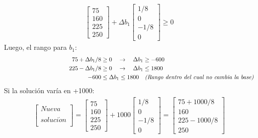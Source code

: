 \begin{enumerate}
\begin{align*}
				\left[{
					\begin{array}{c}
						75\\
						160\\
						225\\
						250	
					\end{array} 
				} \right] 
				+
				\Delta{b_1}
				\left[{
					\begin{array}{c}
						1/8\\
						0\\
						-1/8\\
						0	
					\end{array} 
				} \right]  
				\geq 0
		\end{align*}
		Luego, el rango para $b_1$:
		\begin{align*}
			\hspace{4cm}
				75 + \Delta{b_1}/8 &\geq 0 \quad \rightarrow \quad \Delta{b_1} \geq -600\\
				225 - \Delta{b_1}/8 &\geq 0 \quad \rightarrow \quad \Delta{b_1} \leq 1800\\
				-600 &\leq \Delta{b_1} \leq 1800 \quad\emph{(Rango dentro del cual no cambia la base)}
		\end{align*}
		Si la solución varía en +1000:
		\begin{align*}
			\left[{
				\begin{array}{c}
					Nueva\\
					\\
					soluci\acute{o}n\\			
				\end{array} 
			} \right] 
			=
			\left[{
				\begin{array}{c}
					75\\
					160\\
					225\\
					250
				\end{array} 
			} \right] 
			+
			1000
			\left[{
				\begin{array}{c}
					1/8\\
					0\\
					-1/8\\
					0	
				\end{array} 
			} \right]
			=
			\left[{
				\begin{array}{c}
					75 + 1000/8\\
					160\\
					225 - 1000/8\\
					250	
				\end{array} 
			} \right]

\end{align*}
\end{enumerate}
